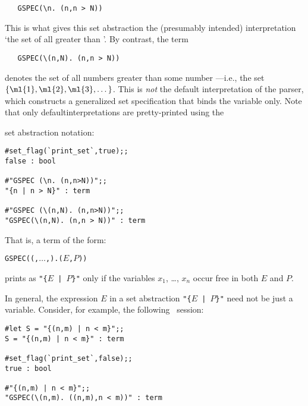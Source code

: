 \begin{hol}
\begin{verbatim}
   GSPEC(\n. (n,n > N))
\end{verbatim}\end{hol}

\noindent This is what gives this set abstraction the (presumably intended)
interpretation `the set of all  greater than '.  By contrast, the
term

\begin{hol}
\begin{verbatim}
   GSPEC(\(n,N). (n,n > N))
\end{verbatim}\end{hol}

\noindent denotes the set of all numbers  greater than some number
---i.e., the set $\{\ml{1},\ml{2},\ml{3},\dots\}$.  This is {\it not\/}
the default interpretation of the parser, which constructs a generalized set
specification that binds the variable  only. Note that only
default\pagebreak[3] interpretations are pretty-printed using the {\samepage
set abstraction notation:

\begin{session}
\begin{verbatim}
#set_flag(`print_set`,true);;
false : bool

#"GSPEC (\n. (n,n>N))";;
"{n | n > N}" : term

#"GSPEC (\(n,N). (n,n>N))";;
"GSPEC(\(n,N). (n,n > N))" : term
\end{verbatim}\end{session}

\noindent That is, a term of the form:

\begin{hol}
\begin{alltt}
   GSPEC (\bk(,\(\dots\),).(\(E\),\(P\)))
\end{alltt}\end{hol}

\noindent prints as {\small\verb!"{!$E$\verb! | !$P$\verb!}"!} only if the
variables $x_1$, \dots, $x_n$ occur free in both $E$ and $P$.}


In general, the expression $E$ in a set abstraction
{\small\verb!"{!$E$\verb! | !$P$\verb!}"!} need not be just a variable.
Consider, for example, the following \HOL\ session:

\begin{session}
\begin{verbatim}
#let S = "{(n,m) | n < m}";;
S = "{(n,m) | n < m}" : term

#set_flag(`print_set`,false);;
true : bool

#"{(n,m) | n < m}";;
"GSPEC(\(n,m). ((n,m),n < m))" : term
\end{verbatim}\end{session}

